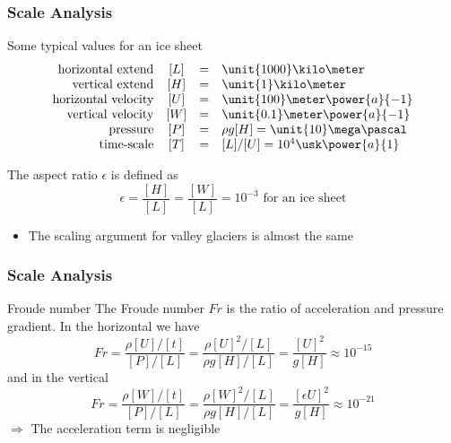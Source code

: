 \documentclass[hide notes,intlimits]{beamer}
\begin{document}
\begin{frame}
  \frametitle{Scale Analysis}
  \begin{block}{Some typical values for an ice sheet}
  \begin{equation*}
  \begin{array}{rccl}
    \text{horizontal extend} &  [L] & = & \unit{1000}\kilo\meter\\
    \text{vertical extend} & [H] & = & \unit{1}\kilo\meter \\
    \text{horizontal velocity} & [U] & = & \unit{100}\meter\power{a}{-1}\\
    \text{vertical velocity} & [W] & = & \unit{0.1}\meter\power{a}{-1}\\
    \text{pressure} & [P] & = & \rho g[H] = \unit{10}\mega\pascal\\
    \text{time-scale} & [T] & = &[L]/[U] = 10^{4}\usk\power{a}{1}\\
  \end{array}
  \end{equation*}
  \end{block}
  The aspect ratio $\epsilon$ is defined as
  \begin{equation*}
    \epsilon = \frac{[H]}{[L]} = \frac{[W]}{[L]} = 10^{-3} \text{ for an ice sheet}
  \end{equation*}
  \begin{itemize}
    \item The scaling argument for valley glaciers is almost the same
  \end{itemize}
\end{frame}


\begin{frame}
  \frametitle{Scale Analysis}
  \begin{block}{Froude number}
    The \alert{Froude number $Fr$} is the ratio of acceleration and pressure gradient. In the horizontal we have
  \begin{equation*}
    Fr = \frac{\rho[U]/[t]}{[P]/[L]} = \frac{\rho[U]^{2}/[L]}{\rho g [H]/[L]} = \frac{[U]^{2}}{g[H]} \approx 10^{-15}
  \end{equation*}
  and in the vertical
  \begin{equation*}
    Fr = \frac{\rho[W]/[t]}{[P]/[L]} = \frac{\rho[W]^{2}/[L]}{\rho g [H]/[L]} = \frac{[\epsilon U]^{2}}{g[H]} \approx 10^{-21}
  \end{equation*}
  $\Rightarrow$ The \alert{acceleration term} is \alert{negligible}
  \end{block}
\end{frame}
\end{document}
